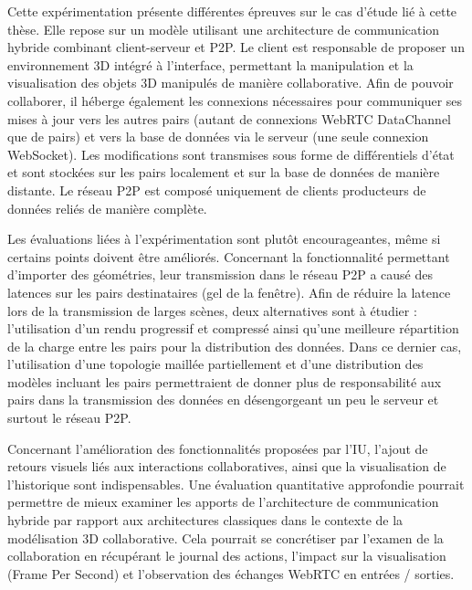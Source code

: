 Cette expérimentation présente différentes épreuves sur le cas d'étude lié à cette 
thèse. Elle repose sur un modèle utilisant une architecture de communication 
hybride combinant client-serveur et \gls{P2P}. Le client est responsable de 
proposer un environnement \gls{3D} intégré à l'interface, permettant la 
manipulation et la visualisation des objets \gls{3D} manipulés de manière 
collaborative. Afin de pouvoir collaborer, il héberge également les connexions 
nécessaires pour communiquer ses mises à jour vers les autres pairs 
(autant de connexions WebRTC DataChannel que de pairs) et vers la base de données
via le serveur (une seule connexion WebSocket). Les modifications sont transmises
sous forme de différentiels d'état et sont stockées sur les pairs localement et 
sur la base de données de manière distante. 
Le réseau \gls{P2P} est composé uniquement de clients producteurs de 
données reliés de manière complète. 

Les évaluations liées à l'expérimentation sont plutôt encourageantes, même si 
certains points doivent être améliorés. Concernant la fonctionnalité permettant 
d'importer des géométries, leur transmission dans le réseau \gls{P2P} a causé 
des latences sur les pairs destinataires (gel de la fenêtre). 
Afin de réduire la latence lors de la transmission de larges scènes, deux alternatives 
sont à étudier : l'utilisation d'un 
rendu progressif et compressé ainsi qu'une meilleure répartition de la charge entre 
les pairs pour la distribution des données. Dans ce dernier cas, l'utilisation d'une 
topologie maillée partiellement et d'une distribution des modèles incluant les pairs 
permettraient de donner plus de responsabilité aux pairs dans la transmission des 
données en désengorgeant
un peu le serveur et surtout le réseau \gls{P2P}.

Concernant l'amélioration des fonctionnalités proposées par l'\gls{IU}, 
l'ajout de retours visuels liés aux interactions collaboratives, 
ainsi que la visualisation de l'historique sont 
indispensables. Une évaluation quantitative approfondie pourrait permettre de 
mieux examiner les apports de l'architecture de communication hybride par rapport 
aux architectures classiques dans le contexte de la modélisation \gls{3D} 
collaborative. 
Cela pourrait se concrétiser par l'examen de la collaboration en récupérant le 
journal des actions, l'impact sur la visualisation (Frame Per Second) et 
l'observation des échanges WebRTC en entrées / sorties.

